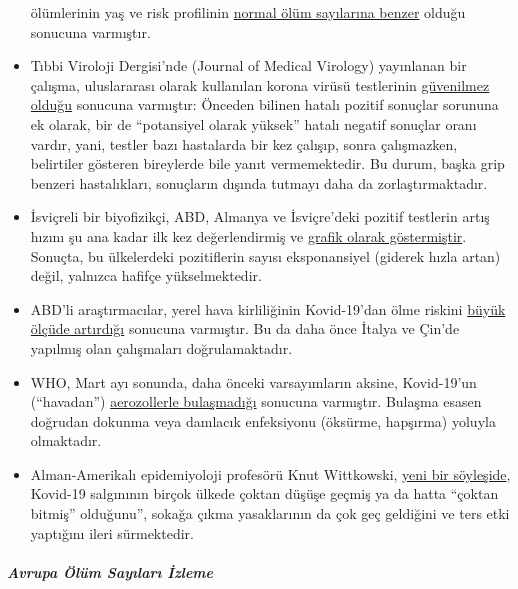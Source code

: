 \begin{itemize}
  ölümlerinin yaş ve risk profilinin
  \href{https://www.vienna.at/analyse-zeigt-covid-19-opferkurve-entspricht-normaler-mortalitaet/6581246}{normal
  ölüm sayılarına benzer} olduğu sonucuna varmıştır.
\item
  Tıbbi Viroloji Dergisi'nde (Journal of Medical Virology) yayınlanan
  bir çalışma, uluslararası olarak kullanılan korona virüsü testlerinin
  \href{https://www.ncbi.nlm.nih.gov/pubmed/32219885}{güvenilmez olduğu}
  sonucuna varmıştır: Önceden bilinen hatalı pozitif sonuçlar sorununa
  ek olarak, bir de ``potansiyel olarak yüksek'' hatalı negatif sonuçlar
  oranı vardır, yani, testler bazı hastalarda bir kez çalışıp, sonra
  çalışmazken, belirtiler gösteren bireylerde bile yanıt vermemektedir.
  Bu durum, başka grip benzeri hastalıkları, sonuçların dışında tutmayı
  daha da zorlaştırmaktadır.
\item
  İsviçreli bir biyofizikçi, ABD, Almanya ve İsviçre'deki pozitif
  testlerin artış hızını şu ana kadar ilk kez değerlendirmiş ve
  \href{https://swprs.org/rate-of-positive-covid19-tests/}{grafik olarak
  göstermiştir}. Sonuçta, bu ülkelerdeki pozitiflerin sayısı
  eksponansiyel (giderek hızla artan) değil, yalnızca hafifçe
  yükselmektedir.
\item
  ABD'li araştırmacılar, yerel hava kirliliğinin Kovid-19'dan ölme
  riskini
  \href{https://www.medrxiv.org/content/10.1101/2020.04.05.20054502v1}{büyük
  ölçüde artırdığı} sonucuna varmıştır. Bu da daha önce İtalya ve Çin'de
  yapılmış olan çalışmaları doğrulamaktadır.
\item
  WHO, Mart ayı sonunda, daha önceki varsayımların aksine, Kovid-19'un
  (``havadan'')
  \href{https://www.who.int/news-room/commentaries/detail/modes-of-transmission-of-virus-causing-covid-19-implications-for-ipc-precaution-recommendations}{aerozollerle
  bulaşmadığı} sonucuna varmıştır. Bulaşma esasen doğrudan dokunma veya
  damlacık enfeksiyonu (öksürme, hapşırma) yoluyla olmaktadır.
\item
  Alman-Amerikalı epidemiyoloji profesörü Knut Wittkowski,
  \href{https://www.youtube.com/watch?v=ARTf4bpiXuI}{yeni bir
  söyleşide}, Kovid-19 salgınının birçok ülkede çoktan düşüşe geçmiş ya
  da hatta ``çoktan bitmiş'' olduğunu'', sokağa çıkma yasaklarının da
  çok geç geldiğini ve ters etki yaptığını ileri sürmektedir.
\end{itemize}

\hypertarget{avrupa-uxf6luxfcm-sayux131larux131-izleme}{%
\subparagraph{\texorpdfstring{\textbf{Avrupa Ölüm Sayıları
İzleme}}{Avrupa Ölüm Sayıları İzleme}}\label{avrupa-uxf6luxfcm-sayux131larux131-izleme}}


